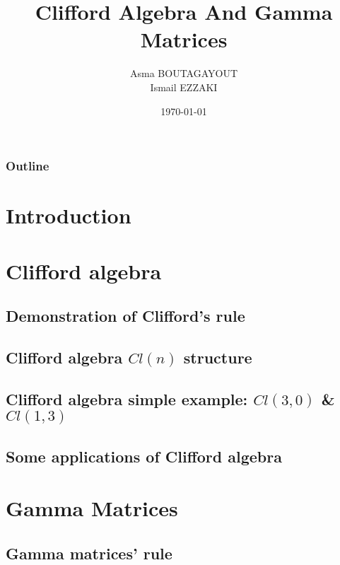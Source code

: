 \documentclass[serif,11pt]{beamer}
\title[ \hspace{0.8cm} \insertframenumber/\inserttotalframenumber]{{\sc Clifford Algebra And Gamma Matrices }}
\author{{Asma BOUTAGAYOUT \\ Ismail EZZAKI}}
\date  {\today}
\institute{University Cadi Ayyad \\Faculty of Sciences Semlalia \\ Physics Departement}
\begin{document}
\begin{frame}
  \begin{center}
    \vspace{0.1cm}
  \end{center}
\titlepage
\end{frame}

\begin{frame}
  \frametitle{Outline}
	\tableofcontents
\end{frame}

\section{Introduction}




\section{Clifford algebra}

\subsection{Demonstration of Clifford’s rule}

\subsection{Clifford algebra $Cl(n)$ structure}

\subsection{Clifford algebra simple example: $Cl(3,0)$ \& $Cl(1,3)$ }

\subsection{Some applications of Clifford algebra}

\section{ Gamma Matrices}
%
\subsection{Gamma matrices’ rule}

\end{document}
